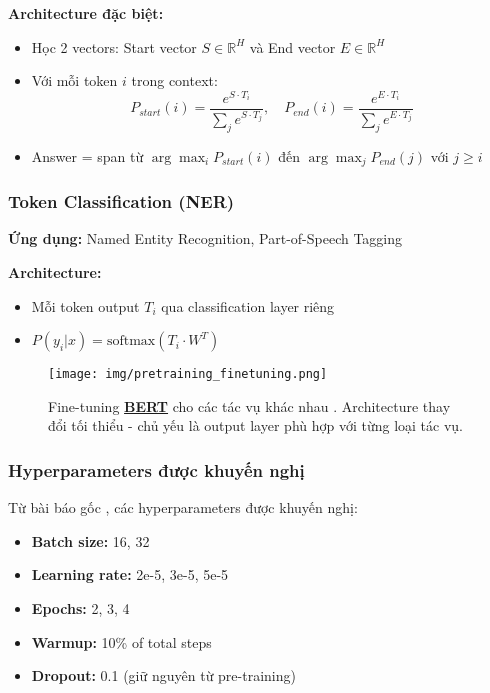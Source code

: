 \textbf{Architecture đặc biệt:}
\begin{itemize}
    \item Học 2 vectors: Start vector $S \in \mathbb{R}^H$ và End vector $E \in \mathbb{R}^H$
    \item Với mỗi token $i$ trong context:
    \begin{equation}
    P_{start}(i) = \frac{e^{S \cdot T_i}}{\sum_j e^{S \cdot T_j}}, \quad P_{end}(i) = \frac{e^{E \cdot T_i}}{\sum_j e^{E \cdot T_j}}
    \label{eq:qa_probability}
    \end{equation}
    \item Answer = span từ $\arg\max_i P_{start}(i)$ đến $\arg\max_j P_{end}(j)$ với $j \geq i$
\end{itemize}

\subsubsection{Token Classification (NER)}
\textbf{Ứng dụng:} Named Entity Recognition, Part-of-Speech Tagging

\textbf{Architecture:}
\begin{itemize}
    \item Mỗi token output $T_i$ qua classification layer riêng
    \item $P(y_i|x) = \text{softmax}(T_i \cdot W^T)$
\end{itemize}

\begin{figure}[H]
    \centering
    \texttt{[image: img/pretraining\_finetuning.png]}
    \caption{Fine-tuning \hyperref[acro:bert]{\textbf{BERT}} cho các tác vụ khác nhau \cite{devlin2018bert}. Architecture thay đổi tối thiểu - chủ yếu là output layer phù hợp với từng loại tác vụ.}
    \label{fig:bert_finetuning_tasks}
\end{figure}

\subsubsection{Hyperparameters được khuyến nghị}
Từ bài báo gốc \cite{devlin2018bert}, các hyperparameters được khuyến nghị:
\begin{itemize}
    \item \textbf{Batch size:} 16, 32
    \item \textbf{Learning rate:} 2e-5, 3e-5, 5e-5 
    \item \textbf{Epochs:} 2, 3, 4
    \item \textbf{Warmup:} 10\% of total steps
    \item \textbf{Dropout:} 0.1 (giữ nguyên từ pre-training)
\end{itemize}

